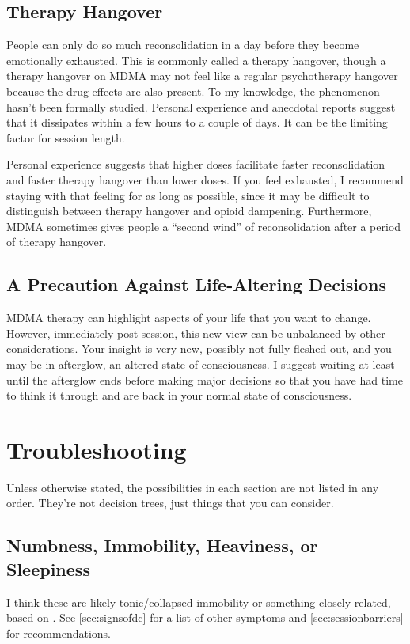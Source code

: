 \documentclass[11pt,oneside]{book}
\begin{document}
\subsection*{Therapy Hangover}
People can only do so much reconsolidation in a day before they become emotionally exhausted. This is commonly called a therapy hangover, though a therapy hangover on MDMA may not feel like a regular psychotherapy hangover because the drug effects are also present. To my knowledge, the phenomenon hasn't been formally studied. Personal experience and anecdotal reports suggest that it dissipates within a few hours to a couple of days. It can be the limiting factor for session length.

Personal experience suggests that higher doses facilitate faster reconsolidation and faster therapy hangover than lower doses. If you feel exhausted, I recommend staying with that feeling for as long as possible, since it may be difficult to distinguish between therapy hangover and opioid dampening. Furthermore, MDMA sometimes gives people a \enquote{second wind} of reconsolidation after a period of therapy hangover.

\subsection*{A Precaution Against Life-Altering Decisions}
MDMA therapy can highlight aspects of your life that you want to change. However, immediately post-session, this new view can be unbalanced by other considerations. Your insight is very new, possibly not fully fleshed out, and you may be in afterglow, an altered state of consciousness. I suggest waiting at least until the afterglow ends before making major decisions so that you have had time to think it through and are back in your normal state of consciousness.

\section{Troubleshooting}
\label{sec:troubleshooting}
Unless otherwise stated, the possibilities in each section are not listed in any order. They're not decision trees, just things that you can consider.
\subsection{Numbness, Immobility, Heaviness, or Sleepiness}
I think these are likely tonic/collapsed immobility or something closely related, based on \textcite{razviPSIP}. See \cref{sec:signsofdc} for a list of other symptoms and \cref{sec:sessionbarriers} for recommendations.
\end{document}
